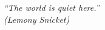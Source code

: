 \begin{epigrafe}
    \vspace*{\fill}
	\begin{flushright}
		\textit{``The world is quiet here.''\\
		(Lemony Snicket)}
	\end{flushright}
\end{epigrafe}
